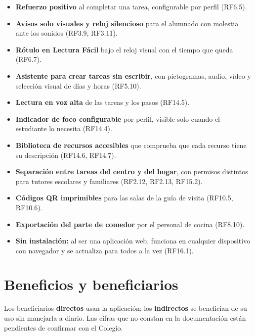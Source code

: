 \documentclass[11pt,a4paper]{article}
\newcommand{\hl}[1]{\textcolor{gblue}{\textbf{#1}}}
\begin{document}
\begin{itemize}
\item \hl{Refuerzo positivo} al completar una tarea, configurable por perfil (RF6.5).
\item \hl{Avisos solo visuales y reloj silencioso} para el alumnado con molestia ante los sonidos (RF3.9, RF3.11).
\item \hl{Rótulo en Lectura Fácil} bajo el reloj visual con el tiempo que queda (RF6.7).
\item \hl{Asistente para crear tareas sin escribir}, con pictogramas, audio, vídeo y selección visual de días y horas (RF5.10).
\item \hl{Lectura en voz alta} de las tareas y los pasos (RF14.5).
\item \hl{Indicador de foco configurable} por perfil, visible solo cuando el estudiante lo necesita (RF14.4).
\item \hl{Biblioteca de recursos accesibles} que comprueba que cada recurso tiene su descripción (RF14.6, RF14.7).
\item \hl{Separación entre tareas del centro y del hogar}, con permisos distintos para tutores escolares y familiares (RF2.12, RF2.13, RF15.2).
\item \hl{Códigos QR imprimibles} para las salas de la guía de visita (RF10.5, RF10.6).
\item \hl{Exportación del parte de comedor} por el personal de cocina (RF8.10).
\item \hl{Sin instalación:} al ser una aplicación web, funciona en cualquier dispositivo con navegador y se actualiza para todos a la vez (RF16.1).
\end{itemize}
\section{Beneficios y beneficiarios}
Los beneficiarios \hl{directos} usan la aplicación; los \hl{indirectos} se benefician de su uso sin manejarla a diario. Las cifras que no constan en la documentación están pendientes de confirmar con el Colegio.
\end{document}
